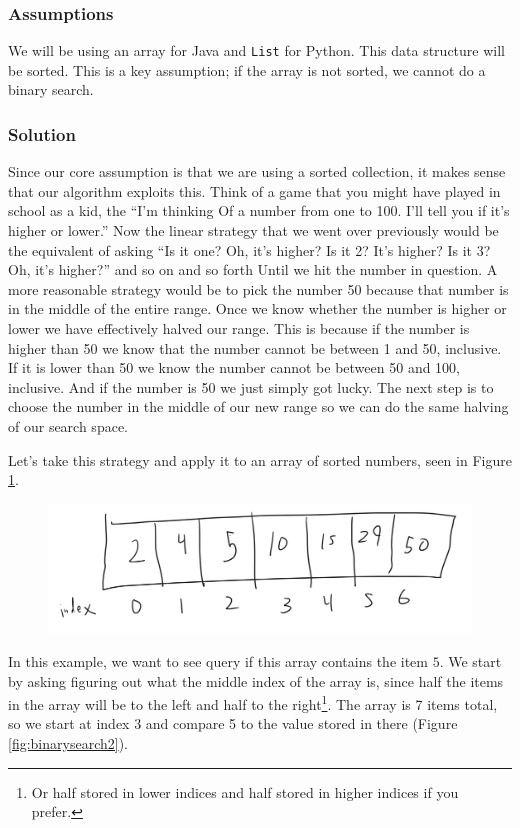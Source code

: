 \subsubsection{Assumptions}
We will be using an array for Java and \texttt{List} for Python.  This data structure will be sorted.  This is a key assumption;  if the array is not sorted, we cannot do a binary search.

\subsubsection{Solution}
Since our core assumption is that we are using a sorted collection, it makes sense that our algorithm exploits this.  Think of a game that you might have played in school as a kid, the ``I'm thinking Of a number from one to 100. I'll tell you if it's higher or lower.''  Now the linear strategy that we went over previously would be the equivalent of asking ``Is it one? Oh, it's higher? Is it 2? It's higher? Is it 3? Oh, it's higher?'' and so on and so forth Until we hit the number in question. A more reasonable strategy would be to pick the number 50 because that number is in the middle of the entire range.  Once we know whether the number is higher or lower we have effectively halved our range. This is because if the number is higher than 50 we know that the number cannot be between 1 and 50, inclusive. If it is lower than 50 we know the number cannot be between 50 and 100, inclusive.   And if the number is 50 we just simply got lucky.
The next step is to choose the number in the middle of our new range so we can do the same halving of our search space.

Let's take this strategy and apply it to an array of sorted numbers, seen in Figure \ref{fig:binarysearch1}.

 
\begin{figure}[h!]
	\centering
	\includegraphics[width=0.7\linewidth]{pics/binarySearch1}
	\caption{}
	\label{fig:binarysearch1}
\end{figure}


In this example, we want to see query if this array contains the item $5.$   We start by asking figuring out what the middle index of the array is, since half the items in the array will be to the left and half to the right\footnote{Or half stored in lower indices and half stored in higher indices if you prefer.}.  The array is 7 items total, so we start at index 3  and compare 5 to the value stored in there (Figure \ref{fig:binarysearch2}).

